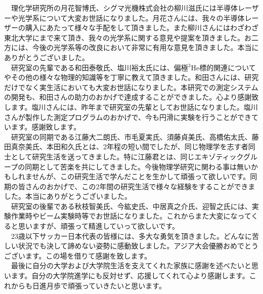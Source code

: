 \documentclass[12pt,a4j,openany,report]{jsbook}
\begin{document}
　理化学研究所の月花智博氏、シグマ光機株式会社の柳川滋氏には半導体レーザーや光学系について大変お世話になりました。月花さんには、我々の半導体レーザーの購入にあたって様々な手配をして頂きました。また柳川さんにはわざわざ東北大学にまで来て頂き、我々の光学系に関する意見や提案を頂きました。お二方には、今後の光学系等の改良において非常に有用な意見を頂きました。本当にありがとうございました。\\
　研究室の先輩である和田泰敬氏、塩川裕太氏には、偏極$^3$He標的関連についてやその他の様々な物理的知識等を丁寧に教えて頂きました。和田さんには、研究だけでなく実生活においても大変お世話になりました。本研究での測定システムの開発も、和田さんの助力のおかげで達成することができました。心より感謝致します。塩川さんには、昨年まで研究室の先輩としてお世話になりました。塩川さんが製作した測定プログラムのおかげで、今も円滑に実験を行うことができています。感謝致します。\\
　研究室の同期である江藤大二朗氏、市毛夏実氏、須藤貞美氏、高橋佑太氏、藤田真奈美氏、本田和久氏とは、2年程の短い間でしたが、同じ物理学を志す者同士として研究生活を送ってきました。特に江藤君とは、同じエキゾティックグループの同期として苦楽を共にしてきました。今後物理学研究に関わる事は無いかもしれませんが、この研究生活で学んだことを生かして頑張って欲しいです。同期の皆さんのおかげで、この2年間の研究生活で様々な経験をすることができました。本当にありがとうございました。\\
　研究室の後輩である秋枝智美氏、今紘史氏、中居真之介氏、迎智之氏には、実験作業時やビーム実験時等でお世話になりました。これからまた大変になってくると思いますが、頑張って精進していって欲しいです。\\
　23歳以下サッカー日本代表の皆様には、多大な勇気を頂きました。どんなに苦しい状況でも決して諦めない姿勢に感動致しました。アジア大会優勝おめでとうございます。この場を借りて感謝を致します。\\
　最後に自分の大学および大学院生活を支えてくれた家族に感謝を述べたいと思います。自分の大学院進学にも反対せず、応援してくれて心より感謝します。これからも日進月歩で頑張っていきたいと思います。



\end{document}
